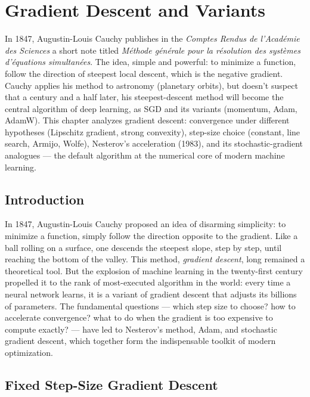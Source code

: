 \chapter{Gradient Descent and Variants}
\label{ch:gradient}

In 1847, Augustin-Louis Cauchy publishes in the \emph{Comptes Rendus de l'Académie des Sciences} a short note titled \emph{Méthode générale pour la résolution des systèmes d'équations simultanées}. The idea, simple and powerful: to minimize a function, follow the direction of steepest local descent, which is the negative gradient. Cauchy applies his method to astronomy (planetary orbits), but doesn't suspect that a century and a half later, his steepest-descent method will become the central algorithm of deep learning, as SGD and its variants (momentum, Adam, AdamW). This chapter analyzes gradient descent: convergence under different hypotheses (Lipschitz gradient, strong convexity), step-size choice (constant, line search, Armijo, Wolfe), Nesterov's acceleration (1983), and its stochastic-gradient analogues --- the default algorithm at the numerical core of modern machine learning.

\section{Introduction}

In 1847, Augustin-Louis Cauchy proposed an idea of disarming simplicity: to minimize a function, simply follow the direction opposite to the gradient. Like a ball rolling on a surface, one descends the steepest slope, step by step, until reaching the bottom of the valley. This method, \emph{gradient descent}, long remained a theoretical tool. But the explosion of machine learning in the twenty-first century propelled it to the rank of most-executed algorithm in the world: every time a neural network learns, it is a variant of gradient descent that adjusts its billions of parameters. The fundamental questions --- which step size to choose? how to accelerate convergence? what to do when the gradient is too expensive to compute exactly? --- have led to Nesterov's method, Adam, and stochastic gradient descent, which together form the indispensable toolkit of modern optimization.

\section{Fixed Step-Size Gradient Descent}

